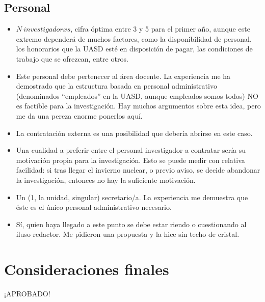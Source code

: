 \documentclass[12pt,letterpaper,spanish]{article}
\begin{document}
\subsection{Personal} \label{cap:personal}

\begin{itemize}
\item $N~investigadorxs$, cifra óptima entre 3 y 5 para el primer año, aunque este extremo dependerá de muchos factores, como la disponibilidad de personal, los honorarios que la UASD esté en disposición de pagar, las condiciones de trabajo que se ofrezcan, entre otros.
\item Este personal debe pertenecer al área docente. La experiencia me ha demostrado que la estructura basada en personal administrativo (denominados ``empleados'' en la UASD, aunque empleados somos todos) NO es factible para la investigación. Hay muchos argumentos sobre esta idea, pero me da una pereza enorme ponerlos aquí.
\item La contratación externa es una posibilidad que debería abrirse en este caso.
\item Una cualidad a preferir entre el personal investigador a contratar sería su motivación propia para la investigación. Esto se puede medir con relativa facilidad: si tras llegar el invierno nuclear, o previo aviso, se decide abandonar la investigación, entonces no hay la suficiente motivación.
\item Un (1, la unidad, singular) secretario/a. La experiencia me demuestra que éste es el único personal administrativo necesario.
\item Sí, quien haya llegado a este punto se debe estar riendo o cuestionando al iluso redactor. Me pidieron una propuesta y la hice sin techo de cristal.
\end{itemize}


\section{Consideraciones finales} \label{cap:considfinales}

¡APROBADO!



\end{document}
